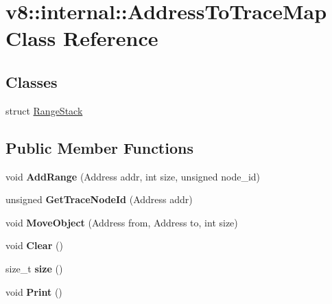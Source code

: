 \hypertarget{classv8_1_1internal_1_1_address_to_trace_map}{}\section{v8\+:\+:internal\+:\+:Address\+To\+Trace\+Map Class Reference}
\label{classv8_1_1internal_1_1_address_to_trace_map}
\subsection*{Classes}
\begin{DoxyCompactItemize}
\item 
struct \hyperlink{structv8_1_1internal_1_1_address_to_trace_map_1_1_range_stack}{Range\+Stack}
\end{DoxyCompactItemize}
\subsection*{Public Member Functions}
\begin{DoxyCompactItemize}
\item 
void {\bfseries Add\+Range} (Address addr, int size, unsigned node\+\_\+id)\hypertarget{classv8_1_1internal_1_1_address_to_trace_map_a3b1bc8f1abc6f072a660d2b689852838}{}\label{classv8_1_1internal_1_1_address_to_trace_map_a3b1bc8f1abc6f072a660d2b689852838}

\item 
unsigned {\bfseries Get\+Trace\+Node\+Id} (Address addr)\hypertarget{classv8_1_1internal_1_1_address_to_trace_map_ab76fa587a105ae24f300f171d8cb22a6}{}\label{classv8_1_1internal_1_1_address_to_trace_map_ab76fa587a105ae24f300f171d8cb22a6}

\item 
void {\bfseries Move\+Object} (Address from, Address to, int size)\hypertarget{classv8_1_1internal_1_1_address_to_trace_map_a02c96d03b3486527aeb46a461c43cf15}{}\label{classv8_1_1internal_1_1_address_to_trace_map_a02c96d03b3486527aeb46a461c43cf15}

\item 
void {\bfseries Clear} ()\hypertarget{classv8_1_1internal_1_1_address_to_trace_map_aa705b7b0e3c00645af20ff4d61140f02}{}\label{classv8_1_1internal_1_1_address_to_trace_map_aa705b7b0e3c00645af20ff4d61140f02}

\item 
size\+\_\+t {\bfseries size} ()\hypertarget{classv8_1_1internal_1_1_address_to_trace_map_a6acf57cbb1975fe242c744f4ad5669f3}{}\label{classv8_1_1internal_1_1_address_to_trace_map_a6acf57cbb1975fe242c744f4ad5669f3}

\item 
void {\bfseries Print} ()\hypertarget{classv8_1_1internal_1_1_address_to_trace_map_a8aa12b1b9b85be5aba73b0631d1ea389}{}\label{classv8_1_1internal_1_1_address_to_trace_map_a8aa12b1b9b85be5aba73b0631d1ea389}

\end{DoxyCompactItemize}
